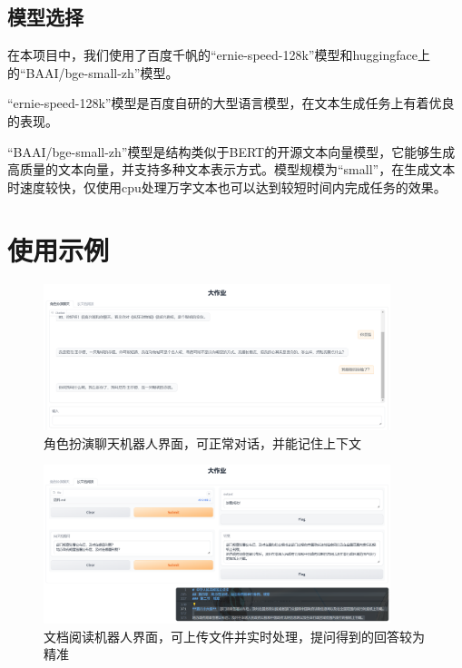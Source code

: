\documentclass[lang=cn,a4paper,founder,bibend=bibtex,citestyle=gb7714-2015, bibstyle=gb7714-2015]{elegantpaper}
\begin{document}
\subsection{模型选择}


在本项目中，我们使用了百度千帆的“ernie-speed-128k”模型和huggingface上的“BAAI/bge-small-zh”模型。

“ernie-speed-128k”模型是百度自研的大型语言模型，在文本生成任务上有着优良的表现。

“BAAI/bge-small-zh”模型是结构类似于BERT的开源文本向量模型\cite{xiao2024cpackpackagedresourcesadvance}，它能够生成高质量的文本向量，并支持多种文本表示方式。模型规模为“small”，在生成文本时速度较快，仅使用cpu处理万字文本也可以达到较短时间内完成任务的效果。

\section{使用示例}

\begin{figure}[H] %
	\centering
	\includegraphics[width=0.9\textwidth]{./image/Clip_240908_1257.png}
	\caption{角色扮演聊天机器人界面，可正常对话，并能记住上下文}
\end{figure}

\begin{figure}[H] %
	\centering
	\includegraphics[width=0.9\textwidth]{./image/Clip_240908_1305.png}
	\caption{文档阅读机器人界面，可上传文件并实时处理，提问得到的回答较为精准}
\end{figure}


\nocite{*}
\printbibliography[heading=bibintoc, title=\ebibname]

\appendix
\addappheadtotoc
\end{document}
